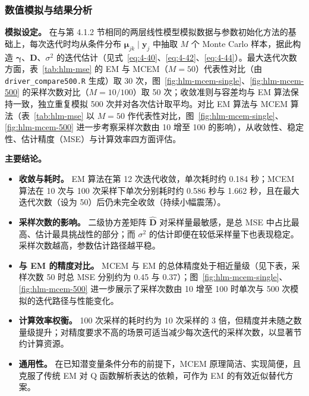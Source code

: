 \documentclass[12pt,a4paper]{ctexart}
\numberwithin{figure}{section}
\numberwithin{table}{section}
\begin{document}
\subsubsection{数值模拟与结果分析}

\textbf{模拟设定。} 在与第 4.1.2 节相同的两层线性模型模拟数据与参数初始化方法的基础上，每次迭代时均从条件分布 $\boldsymbol{\mu}_{jk}\mid \boldsymbol{y}_j$ 中抽取 $M$ 个 Monte Carlo 样本，据此构造 $\boldsymbol{\gamma}$、$\boldsymbol{D}$、$\sigma^2$ 的迭代估计（见式~\eqref{eq:4-40}、\eqref{eq:4-42}、\eqref{eq:4-44}）。最大迭代次数方面，表~\ref{tab:hlm-mse} 的 EM 与 MCEM（$M=50$）代表性对比（由 \texttt{driver\_compare500.R} 生成）取 30 次，图~\ref{fig:hlm-mcem-single}、\ref{fig:hlm-mcem-500} 的采样次数对比（$M=10/100$）取 50 次；收敛准则与容差均与 EM 算法保持一致，独立重复模拟 500 次并对各次估计取平均。对比 EM 算法与 MCEM 算法（表~\ref{tab:hlm-mse} 以 $M=50$ 作代表性对比，图~\ref{fig:hlm-mcem-single}、\ref{fig:hlm-mcem-500} 进一步考察采样次数由 10 增至 100 的影响），从收敛性、稳定性、估计精度（MSE）与计算效率四方面评估。

\textbf{主要结论。}

\begin{itemize}
  \item \textbf{收敛与耗时。} EM 算法在第 12 次迭代收敛，单次耗时约 0.184 秒；MCEM 算法在 10 次与 100 次采样下单次分别耗时约 0.586 秒与 1.662 秒，且在最大迭代次数（设为 50）后仍未完全收敛（持续小幅震荡）。
  \item \textbf{采样次数的影响。} 二级协方差矩阵 $\hat{\boldsymbol{D}}$ 对采样量最敏感，是总 MSE 中占比最高、估计最具挑战性的部分；而 $\sigma^2$ 的估计即便在较低采样量下也表现稳定。采样次数越高，参数估计路径越平稳。
  \item \textbf{与 EM 的精度对比。} MCEM 与 EM 的总体精度处于相近量级（见下表，采样次数 50 时总 MSE 分别约为 0.45 与 0.37）；图~\ref{fig:hlm-mcem-single}、\ref{fig:hlm-mcem-500} 进一步展示了采样次数由 10 增至 100 时单次与 500 次模拟的迭代路径与性能变化。
  \item \textbf{计算效率权衡。} 100 次采样的耗时约为 10 次采样的 3 倍，但精度并未随之数量级提升；对精度要求不高的场景可适当减少每次迭代的采样次数，以显著节约计算资源。
  \item \textbf{通用性。} 在已知潜变量条件分布的前提下，MCEM 原理简洁、实现简便，且克服了传统 EM 对 Q 函数解析表达的依赖，可作为 EM 的有效近似替代方案。
\end{itemize}
\end{document}
